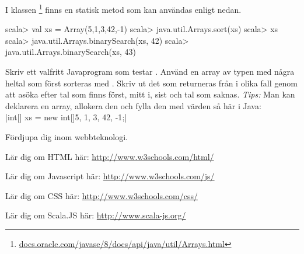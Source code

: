 \Task I klassen \footnote{\href{https://docs.oracle.com/javase/8/docs/api/java/util/Arrays.html}{docs.oracle.com/javase/8/docs/api/java/util/Arrays.html}} finns en statisk metod  som kan användas enligt nedan.
\begin{REPL}
scala> val xs = Array(5,1,3,42,-1)
scala> java.util.Arrays.sort(xs)
scala> xs
scala> java.util.Arrays.binarySearch(xs, 42)
scala> java.util.Arrays.binarySearch(xs, 43)
\end{REPL}
Skriv ett valfritt Javaprogram som testar . Använd en array av typen  med några heltal som först sorteras med .  Skriv ut det som returneras från    i olika fall genom att asöka efter tal som finns först, mitt i, sist och tal som saknas. 
\emph{Tips:} Man kan deklarera en array, allokera den och fylla den med värden så här i Java: \\ 
\jcode|int[] xs = new int[]{5, 1, 3, 42, -1};|


\Task Fördjupa dig inom webbteknologi. 
    
\Subtask Lär dig om HTML här: \url{http://www.w3schools.com/html/}

\Subtask Lär dig om Javascript här: \url{http://www.w3schools.com/js/}

\Subtask Lär dig om CSS här: \url{http://www.w3schools.com/css/}

\Subtask Lär dig om Scala.JS här: \url{http://www.scala-js.org/}



    
